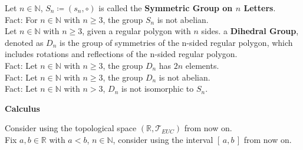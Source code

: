 \documentclass[11pt]{article}
\newcommand{\R}{\mathbb{R}}
\newcommand{\N}{\mathbb{N}}
\newcommand{\T}{\mathcal{T}}
\newcommand{\fact}{\color{gray}Fact: \color{black}}
\begin{document}
		 
		\noindent Let $n \in \N$, $S_n \coloneqq (s_n, \circ)$ is called the \textbf{Symmetric Group on $n$ Letters}.\\
		\fact For $n \in \N$ with $n \geq 3$, the group $S_n$ is not abelian.\\
		
		\noindent Let $n \in \N$ with $n\geq 3$, given a regular polygon with $n$ sides. a \textbf{Dihedral Group}, denoted as $D_n$ is the group of symmetries of the n-sided regular polygon, which includes rotations and reflections of the n-sided regular polygon.\\
		\fact Let $n \in \N$ with $n\geq 3$, the group $D_n$ has $2n$ elements.\\
		\fact Let $n \in \N$ with $n\geq 3$, the group $D_n$ is not abelian.\\
		\fact Let $n \in \N$ with $n >3$, $D_n$ is not isomorphic to $S_n$.\\		
		
	\clearpage
		
		
		
		
		
		
		
		
		
		
		
		
		
		
		
		
		
		
		
		
		
		
		
		


		
		
		
		
		
			

	\color{red}
	\LARGE
		\noindent \textbf{Calculus}\\
	
	\normalsize
	\color{black}	
	
		\noindent \color{red} Consider using the topological space $(\R, \T_{EUC})$ from now on.\\ Fix $a,b \in \R$ with $a<b$, $n \in \N$, consider using the interval $[\,a,b\,]$  from now on. \color{black} \\
		
\end{document}
